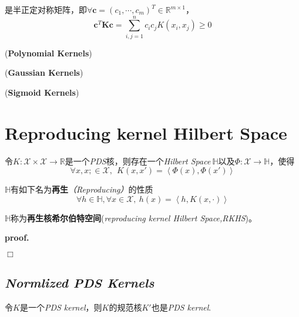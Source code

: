 是半正定对称矩阵，即$\forall \mathbf{c}=(c_1,\cdots,c_m)^T\in \mathbb{R}^{m\times 1}$，
\begin{equation}
    \mathbf{c}^T\mathbf{Kc}=\sum_{i,j=1}^{n}c_ic_jK(x_i,x_j)\geqslant 0
\end{equation}

\begin{example}
    (\textbf{Polynomial Kernels})
\end{example}
\begin{example}
    (\textbf{Gaussian Kernels})
\end{example}
\begin{example}
    (\textbf{Sigmoid Kernels})
\end{example}

\section{Reproducing kernel Hilbert Space}

\begin{mdframed}
    \begin{theorem}
        令$K:\mathcal{X}\times \mathcal{X}\rightarrow \mathbb{R}$是一个\textsl{PDS}核，则存在一个\textsl{Hilbert Space}$\ \mathbb{H}$以及$\Phi:\mathcal{X}\rightarrow \mathbb{H}$，使得
        \begin{equation}
            \forall x,x;\in \mathcal{X},\ \ K(x,x')=\left<\Phi(x),\Phi(x')\right>
        \end{equation}

        $\mathbb{H}$有如下名为\textbf{再生}\textsl{（Reproducing）}的性质
        \begin{equation}
            \forall h\in \mathbb{H},\forall x\in \mathcal{X},\ h(x)=\left< h,K(x,\cdot) \right>
        \end{equation}

        $\mathbb{H}$称为\textbf{再生核希尔伯特空间}(\textsl{reproducing kernel Hilbert Space,RKHS})。
    \end{theorem}
\end{mdframed}

\textbf{proof.}\hspace{1em}

$\Box$

\subsection*{\textsl{Normlized PDS Kernels}}

\begin{mdframed}
    \begin{lemma}
        令$K$是一个\textsl{PDS kernel}，则$K$的规范核$K'$也是\textsl{PDS kernel}.
    \end{lemma}
\end{mdframed}

